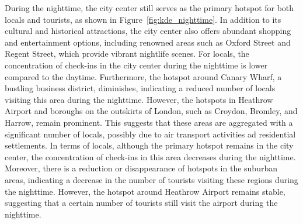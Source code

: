 \documentclass{article}
\theoremstyle{definition}
\theoremstyle{remark}
\begin{document}
During the nighttime, the city center still serves as the primary hotspot for both locals and tourists, as shown in Figure~\ref{fig:kde_nighttime}. In addition to its cultural and historical attractions, the city center also offers abundant shopping and entertainment options, including renowned areas such as Oxford Street and Regent Street, which provide vibrant nightlife scenes. For locals, the concentration of check-ins in the city center during the nighttime is lower compared to the daytime. Furthermore, the hotspot around Canary Wharf, a bustling business district, diminishes, indicating a reduced number of locals visiting this area during the nighttime. However, the hotspots in Heathrow Airport and boroughs on the outskirts of London, such as Croydon, Bromley, and Harrow, remain prominent. This suggests that these areas are aggregated with a significant number of locals, possibly due to air transport activities ad residential settlements. In terms of locals, although the primary hotspot remains in the city center, the concentration of check-ins in this area decreases during the nighttime. Moreover, there is a reduction or disappearance of hotspots in the suburban areas, indicating a decrease in the number of tourists visiting these regions during the nighttime. However, the hotspot around Heathrow Airport remains stable, suggesting that a certain number of tourists still visit the airport during the nighttime.
\end{document}
